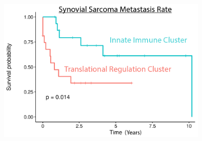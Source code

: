 \documentclass[10pt,letterpaper]{article}
\begin{document}
\begin{table}
	\ContinuedFloat
	
	\centering
	\includegraphics[width=0.75\textwidth]{img/synovial-kaplan-meier-2x}	
\end{table}

\FloatBarrier




\end{document}
